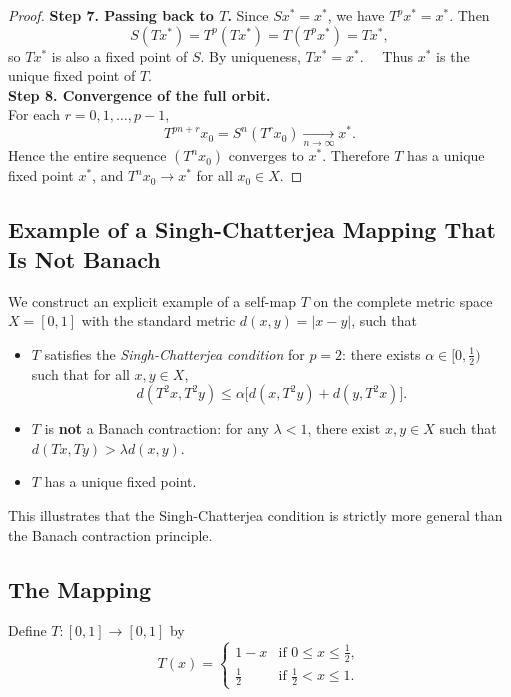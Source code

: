 \documentclass[12pt]{article}
\begin{document}
\begin{proof}
\medskip\noindent\textbf{Step 7. Passing back to $T$.}
Since $Sx^\ast=x^\ast$, 
we have $T^p x^\ast=x^\ast$. 
Then
\[S(Tx^\ast)=T^p(Tx^\ast)=T(T^p x^\ast)=T x^\ast,\]so $T x^\ast$ is also a fixed point of $S$. 
By uniqueness, 
$T x^\ast=x^\ast$.  
Thus $x^\ast$ is the unique fixed point of $T$.\\

\medskip\noindent\textbf{Step 8. Convergence of the full orbit.}\\
For each 
$r=0,1,\dots,p-1$,\[T^{pn+r}x_0=S^n(T^r x_0)\xrightarrow[n\to\infty]{}x^\ast.\]
Hence the entire sequence $(T^n x_0)$ converges to $x^\ast$.
Therefore $T$ has a unique fixed point $x^\ast$, and $T^n x_0\to x^\ast$ for all $x_0\in X$.
\end{proof}

\subsection{Example of a Singh-Chatterjea Mapping That Is Not Banach}
\label{sec:scnotbanach}

We construct an explicit example of a self-map $ T $ on the complete metric space $ X = [0, 1] $ with the standard metric $ d(x,y) = |x - y| $, such that
\begin{itemize}
\item $ T $ satisfies the \emph{Singh-Chatterjea condition} for $ p = 2 $: there exists $ \alpha \in [0, \tfrac{1}{2}) $ such that for all $ x, y \in X $,
    \[
    d(T^2 x, T^2 y) \leq \alpha \big[ d(x, T^2 y) + d(y, T^2 x) \big].
    \]
    \item $ T $ is \textbf{not} a Banach contraction: for any $ \lambda < 1 $, there exist $ x, y \in X $ such that $ d(Tx, Ty) > \lambda d(x,y) $.
    \item $ T $ has a unique fixed point.
\end{itemize}
This illustrates that the Singh-Chatterjea condition is strictly more general than the Banach contraction principle.

\subsection*{The Mapping}

Define $ T: [0,1] \to [0,1] $ by
\[
T(x) = 
\begin{cases}
1 - x & \text{if } 0 \leq x \leq \frac{1}{2}, \\
\frac{1}{2} & \text{if } \frac{1}{2} < x \leq 1.
\end{cases}
\]
\end{document}
